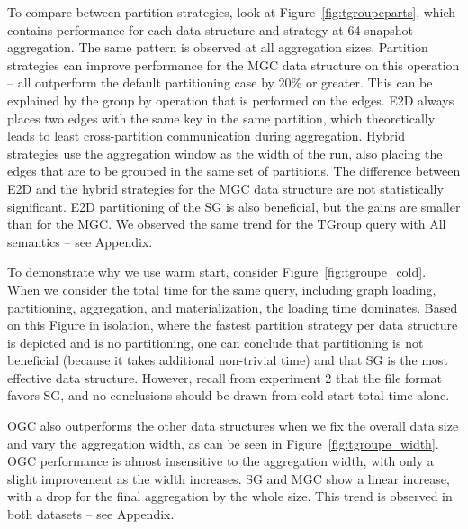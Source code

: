 To compare between partition strategies, look at
Figure~\ref{fig:tgroupeparts}, which contains performance for each
data structure and strategy at 64 snapshot aggregation.  The same
pattern is observed at all aggregation sizes.  Partition strategies
can improve performance for the MGC data structure on this operation
-- all outperform the default partitioning case by 20\% or greater.
This can be explained by the group by operation that is performed on
the edges.  E2D always places two edges with the same key in the same
partition, which theoretically leads to least cross-partition
communication during aggregation.  Hybrid strategies use the
aggregation window as the width of the run, also placing the edges
that are to be grouped in the same set of partitions.  The difference
between E2D and the hybrid strategies for the MGC data structure are
not statistically significant.  E2D partitioning of the SG is also
beneficial, but the gains are smaller than for the MGC.  We observed
the same trend for the TGroup query with All semantics -- see
Appendix.

To demonstrate why we use warm start, consider
Figure~\ref{fig:tgroupe_cold}.  When we consider the total time for
the same query, including graph loading, partitioning, aggregation,
and materialization, the loading time dominates.  Based on this Figure
in isolation, where the fastest partition strategy per data structure
is depicted and is no partitioning, one can conclude that partitioning
is not beneficial (because it takes additional non-trivial time) and
that SG is the most effective data structure.  However, recall from
experiment 2 that the file format favors SG, and no conclusions should
be drawn from cold start total time alone.

OGC also outperforms the other data structures when we fix the overall
data size and vary the aggregation width, as can be seen in
Figure~\ref{fig:tgroupe_width}.  OGC performance is almost insensitive
to the aggregation width, with only a slight improvement as the width
increases.  SG and MGC show a linear increase, with a drop for the
final aggregation by the whole size.  This trend is observed in both
datasets -- see Appendix.


